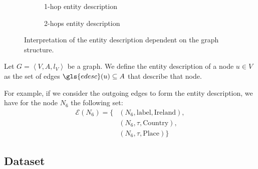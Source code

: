 \begin{figure}
	\centering
	\begin{subfigure}[b]{.45\textwidth}
		\resizebox{.6\textwidth}{!}{
			
		}
		\caption{1-hop entity description}
		\label{fig:edesc1}
	\end{subfigure}
	\quad
	\begin{subfigure}[b]{.45\textwidth}
		\resizebox{\textwidth}{!}{
			
		}
		\caption{2-hops entity description}
		\label{fig:edesc2}
	\end{subfigure}
	\caption{Interpretation of the entity description dependent on the graph structure.}
	\label{fig:edesc}
\end{figure}

%

\begin{definition}
Let $G = \left\langle V, A, l_V \right\rangle$ be a graph. We define the entity description of a node $u \in V$ as the set of edges $\gls{edesc}(u) \subseteq A$ that describe that node.
\end{definition}

For example, if we consider the outgoing edges to form the entity description, we have for the node $N_6$ the following set:
$$
\begin{aligned}
\mathcal{E}\left( N_6 \right) = \{ & \left( N_6, \text{label}, \text{Ireland} \right),\\
& \left( N_6, \tau, \text{Country} \right),\\
& \left( N_6, \tau, \text{Place} \right) \}
\end{aligned}
$$

\subsection{Dataset}

